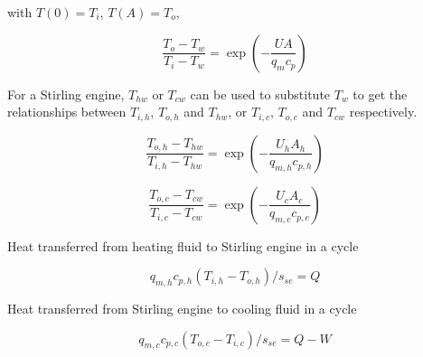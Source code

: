 \documentclass[preprint,5p, twocolumn]{elsarticle}
\begin{document}
with $T(0)=T_i$, $T(A)=T_o$,

\begin{equation}
	\frac{T_o-T_w}{T_i-T_w}=\exp(-\frac{UA}{q_mc_p})
\end{equation}


%
%

For a Stirling engine, $T_{hw}$ or $T_{cw}$ can be used to substitute $T_w$ to get the relationships between $T_{i,h}$, $T_{o,h}$ and $T_{hw}$, or $T_{i,c}$, $T_{o,c}$ and $T_{cw}$ respectively.

\begin{equation}
	\frac{T_{o,h}-T_{hw}}{T_{i,h}-T_{hw}}=\exp(-\frac{U_hA_h}{q_{m,h}c_{p,h}})
	\label{Eq:T_h}
\end{equation}

\begin{equation}
	\frac{T_{o,c}-T_{cw}}{T_{i,c}-T_{cw}}=\exp(-\frac{U_cA_c}{q_{m,c}c_{p,c}})
	\label{Eq:T_c}
\end{equation}

Heat transferred from heating fluid to Stirling engine in a cycle

\begin{equation}
	q_{m,h}c_{p,h}(T_{i,h}-T_{o,h})/s_{se} = Q
	\label{Eq:q_h}
\end{equation}

Heat transferred from Stirling engine to cooling fluid in a cycle

\begin{equation}
	q_{m,c}c_{p,c}(T_{o,c}-T_{i,c})/s_{se} = Q - W
	\label{Eq:q_c}
\end{equation}

\end{document}
